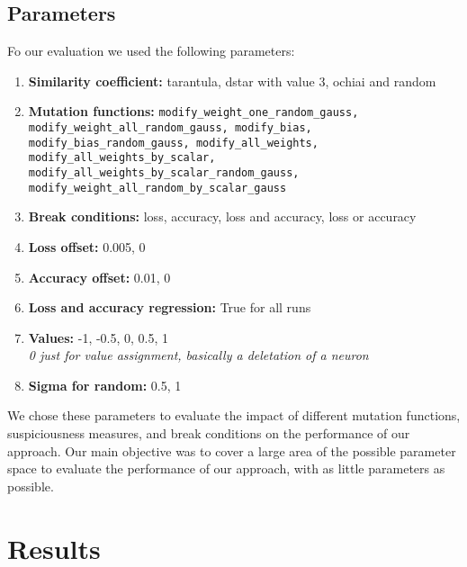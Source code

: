 \subsection{Parameters}\label{subsec:parameters}
Fo our evaluation we used the following parameters:
\begin{enumerate}
    \item[]\textbf{Similarity coefficient:} tarantula, dstar with value 3, ochiai and random
    \item[]\textbf{Mutation functions:} \texttt{modify\_weight\_one\_random\_gauss,\\ modify\_weight\_all\_random\_gauss, modify\_bias, modify\_bias\_random\_gauss, modify\_all\_weights, modify\_all\_weights\_by\_scalar,\\modify\_all\_weights\_by\_scalar\_random\_gauss,\\modify\_weight\_all\_random\_by\_scalar\_gauss}
    \item[]\textbf{Break conditions:} loss, accuracy, loss and accuracy, loss or accuracy
    \item[]\textbf{Loss offset:} 0.005, 0
    \item[]\textbf{Accuracy offset:} 0.01, 0
    \item[]\textbf{Loss and accuracy regression:} True for all runs
    \item[]\textbf{Values:} -1, -0.5, 0, 0.5, 1\\ \textit{0 just for value assignment, basically a deletation of a neuron}
    \item[]\textbf{Sigma for random:} 0.5, 1
\end{enumerate}
We chose these parameters to evaluate the impact of different mutation functions, suspiciousness measures, and break conditions on the performance of our approach.
Our main objective was to cover a large area of the possible parameter space to evaluate the performance of our approach, with as little parameters as possible.
\section{Results}\label{sec:results}

